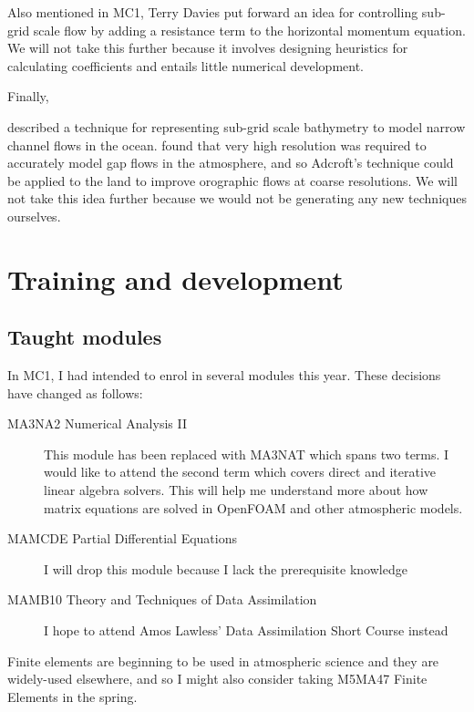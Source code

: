 \documentclass[a4paper]{article}
\begin{document}
Also mentioned in MC1, Terry Davies put forward an idea for controlling sub-grid scale flow by adding a resistance term to the horizontal momentum equation.  We will not take this further because it involves designing heuristics for calculating coefficients and entails little numerical development.

Finally, {\citet{adcroft2013} described a technique for representing sub-grid scale bathymetry to model narrow channel flows in the ocean.  \citet{gohm2004} found that very high resolution was required to accurately model gap flows in the atmosphere, and so Adcroft's technique could be applied to the land to improve orographic flows at coarse resolutions.  We will not take this idea further because we would not be generating any new techniques ourselves.


\section{Training and development}

\subsection*{Taught modules}
In MC1, I had intended to enrol in several modules this year.  These decisions have changed as follows:
\begin{description}
\item[MA3NA2 Numerical Analysis II]{This module has been replaced with MA3NAT which spans two terms.  I would like to attend the second term which covers direct and iterative linear algebra solvers.  This will help me understand more about how matrix equations are solved in OpenFOAM and other atmospheric models.}
\item[MAMCDE Partial Differential Equations]{I will drop this module because I lack the prerequisite knowledge}
\item[MAMB10 Theory and Techniques of Data Assimilation]{I hope to attend Amos Lawless' Data Assimilation Short Course instead}
\end{description}
Finite elements are beginning to be used in atmospheric science and they are widely-used elsewhere, and so I might also consider taking M5MA47 Finite Elements in the spring.

}
\end{document}
